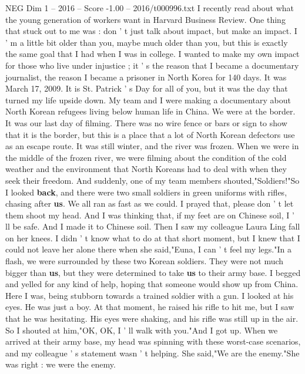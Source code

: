 \begin{textsample}{NEG Dim 1 – 2016 – Score -1.00 – 2016/t000996.txt}  \label{ex:f1_neg_029}
I recently read about what the young generation of workers want in Harvard Business Review.
One thing that stuck out to me was : don ' t just talk about impact, but make an impact.
I ' m a little bit older than you, maybe much older than you, but this is exactly the same goal that I had when I was in college.
I wanted to make my own impact for those who live under injustice ; it ' s the reason that I became a documentary journalist, the reason I became a prisoner in North Korea for 140 days.
It was March 17, 2009.
It is St.
Patrick ' s Day for all of you, but it was the day that turned my life upside down.
My team and I were making a documentary about North Korean refugees living below human life in China.
We were at the border.
It was our last day of filming.
There was no wire fence or bars or sign to show that it is the border, but this is a place that a lot of North Korean defectors use as an escape route.
It was still winter, and the river was frozen.
When we were in the middle of the frozen river, we were filming about the condition of the cold weather and the environment that North Koreans had to deal with when they seek their freedom.
And suddenly, one of my team members shouted,"Soldiers!"So I looked \textbf{back}, and there were two small soldiers in green uniforms with rifles, chasing after \textbf{us}.
We all ran as fast as we could.
I prayed that, please don ' t let them shoot my head.
And I was thinking that, if my feet are on Chinese soil, I ' ll be safe.
And I made it to Chinese soil.
Then I saw my colleague Laura Ling fall on her knees.
I didn ' t know what to do at that short moment, but I knew that I could not leave her alone there when she said,"Euna, I can ' t feel my legs."In a flash, we were surrounded by these two Korean soldiers.
They were not much bigger than \textbf{us}, but they were determined to take \textbf{us} to their army base.
I begged and yelled for any kind of help, hoping that someone would show up from China.
Here I was, being stubborn towards a trained soldier with a gun.
I looked at his eyes.
He was just a boy.
At that moment, he raised his rifle to hit me, but I saw that he was hesitating.
His eyes were shaking, and his rifle was still up in the air.
So I shouted at him,"OK, OK, I ' ll walk with you."And I got up.
When we arrived at their army base, my head was spinning with these worst-case scenarios, and my colleague ' s statement wasn ' t helping.
She said,"We are the enemy."She was right : we were the enemy.

\end{textsample}
